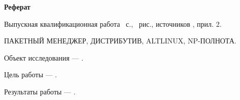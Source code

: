 \begin{center}
	\textbf{Реферат}
\end{center}

Выпускная квалификационная работа ~с., ~рис., источников , прил. 2.

ПАКЕТНЫЙ МЕНЕДЖЕР, ДИСТРИБУТИВ, ALTLINUX, NP-ПОЛНОТА.

Объект исследования --- .

Цель работы --- .

Результаты работы --- .

